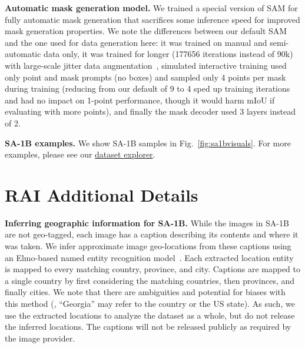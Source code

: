 \documentclass[10pt,twocolumn,letterpaper]{article}
\renewcommand{\paragraph}[1]{\vspace{1.25mm}\noindent\textbf{#1}}
\newcommand{\sad}{\mbox{SA-1B}\xspace}
\newcommand{\sam}{SAM\xspace}
\newcommand{\fig}[1]{Fig.~\ref{#1}}
\begin{document}
\paragraph{Automatic mask generation model.} We trained a special version of \sam for fully automatic mask generation that sacrifices some inference speed for improved mask generation properties. We note the differences between our default \sam and the one used for data generation here: it was trained on manual and semi-automatic data only, it was trained for longer (177656 iterations instead of 90k) with large-scale jitter data augmentation~\cite{Ghiasi2021}, simulated interactive training used only point and mask prompts (no boxes) and sampled only 4 points per mask during training (reducing from our default of 9 to 4 sped up training iterations and had no impact on 1-point performance, though it would harm mIoU if evaluating with more points), and finally the mask decoder used 3 layers instead of 2.

\paragraph{\sad examples.} We show \sad samples in \fig{fig:sa1bvisuals}. For more examples, please see our \href{https://www.segment-anything.com/dataset/index.html}{dataset explorer}.


\section{RAI Additional Details}\label{app:rai}

\paragraph{Inferring geographic information for \sad.} While the images in \sad are not geo-tagged, each image has a caption describing its contents and where it was taken. We infer approximate image geo-locations from these captions using an Elmo-based named entity recognition model~\cite{peters2017semi}. Each extracted location entity is mapped to every matching country, province, and city. Captions are mapped to a single country by first considering the matching countries, then provinces, and finally cities. We note that there are ambiguities and potential for biases with this method (\eg, ``Georgia'' may refer to the country or the US state). As such, we use the extracted locations to analyze the dataset as a whole, but do not release the inferred locations. The captions will not be released publicly as required by the image provider.
\end{document}
